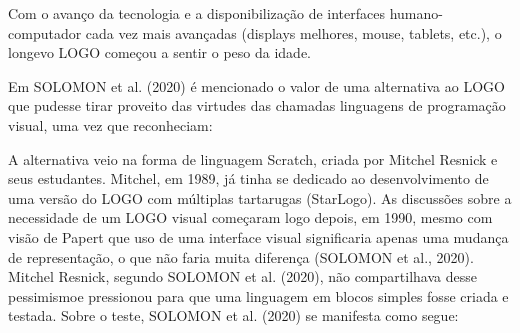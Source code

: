 \documentclass[
12pt,		%
openright,	%
twoside,  %
a4paper,			%
chapter=TITLE,		%
english,			%
french,				%
spanish,			%
brazil				%
]{USPSC-classe/USPSC}
\begin{document}
Com o avan\c{c}o da tecnologia e a disponibiliza\c{c}\~ao de interfaces humano-computador cada vez mais avan\c{c}adas (displays melhores, mouse, tablets, etc.), o longevo LOGO come\c{c}ou a sentir o peso da idade.










Em SOLOMON et al. (2020) \'e mencionado o valor de uma alternativa ao LOGO que pudesse tirar proveito das virtudes das chamadas \textquotedbl linguagens de programa\c{c}\~ao visual\textquotedbl , uma vez que reconheciam:











\noindent\begin{center}\mbox{\centering{}}\end{center}


A alternativa veio na forma de linguagem Scratch, criada por Mitchel Resnick e seus estudantes. Mitchel, em 1989, j\'a tinha se dedicado ao desenvolvimento de uma vers\~ao do LOGO com m\'ultiplas tartarugas (StarLogo). As discuss\~oes sobre a necessidade de um LOGO visual come\c{c}aram logo depois, em 1990, mesmo com vis\~ao de Papert que uso de uma interface visual significaria apenas uma mudan\c{c}a de representa\c{c}\~ao, o que n\~ao faria muita diferen\c{c}a   (SOLOMON et al., 2020). Mitchel Resnick, segundo  SOLOMON et al. (2020), \textquotedbl n\~ao compartilhava desse pessimismo\textquotedbl  e pressionou para que uma linguagem em blocos simples fosse criada e testada. Sobre o teste,  SOLOMON et al. (2020) se manifesta como segue:











\noindent\begin{center}\mbox{\centering{}}\end{center}
\end{document}
